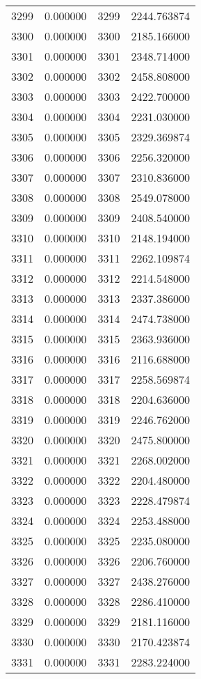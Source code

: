 \documentclass[12pt]{article}
\begin{document}
\begin{longtable}{@{}cccc@{}}
3299 & 0.000000 & 3299 & 2244.763874 \\
3300 & 0.000000 & 3300 & 2185.166000 \\
3301 & 0.000000 & 3301 & 2348.714000 \\
3302 & 0.000000 & 3302 & 2458.808000 \\
3303 & 0.000000 & 3303 & 2422.700000 \\
3304 & 0.000000 & 3304 & 2231.030000 \\
3305 & 0.000000 & 3305 & 2329.369874 \\
3306 & 0.000000 & 3306 & 2256.320000 \\
3307 & 0.000000 & 3307 & 2310.836000 \\
3308 & 0.000000 & 3308 & 2549.078000 \\
3309 & 0.000000 & 3309 & 2408.540000 \\
3310 & 0.000000 & 3310 & 2148.194000 \\
3311 & 0.000000 & 3311 & 2262.109874 \\
3312 & 0.000000 & 3312 & 2214.548000 \\
3313 & 0.000000 & 3313 & 2337.386000 \\
3314 & 0.000000 & 3314 & 2474.738000 \\
3315 & 0.000000 & 3315 & 2363.936000 \\
3316 & 0.000000 & 3316 & 2116.688000 \\
3317 & 0.000000 & 3317 & 2258.569874 \\
3318 & 0.000000 & 3318 & 2204.636000 \\
3319 & 0.000000 & 3319 & 2246.762000 \\
3320 & 0.000000 & 3320 & 2475.800000 \\
3321 & 0.000000 & 3321 & 2268.002000 \\
3322 & 0.000000 & 3322 & 2204.480000 \\
3323 & 0.000000 & 3323 & 2228.479874 \\
3324 & 0.000000 & 3324 & 2253.488000 \\
3325 & 0.000000 & 3325 & 2235.080000 \\
3326 & 0.000000 & 3326 & 2206.760000 \\
3327 & 0.000000 & 3327 & 2438.276000 \\
3328 & 0.000000 & 3328 & 2286.410000 \\
3329 & 0.000000 & 3329 & 2181.116000 \\
3330 & 0.000000 & 3330 & 2170.423874 \\
3331 & 0.000000 & 3331 & 2283.224000 \\

\end{longtable}
\end{document}
